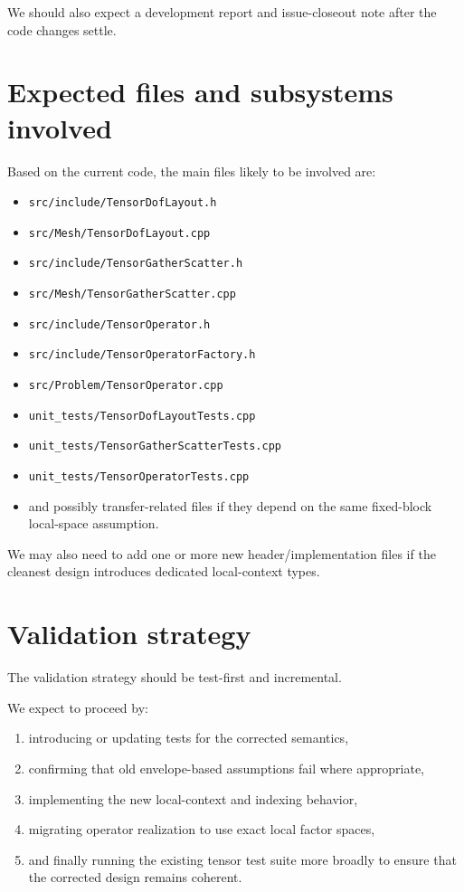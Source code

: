 \documentclass[11pt]{article}
\begin{document}
We should also expect a development report and issue-closeout note after the code changes settle.

\section{Expected files and subsystems involved}

Based on the current code, the main files likely to be involved are:

\begin{itemize}[leftmargin=2em]
\item \texttt{src/include/TensorDofLayout.h}
\item \texttt{src/Mesh/TensorDofLayout.cpp}
\item \texttt{src/include/TensorGatherScatter.h}
\item \texttt{src/Mesh/TensorGatherScatter.cpp}
\item \texttt{src/include/TensorOperator.h}
\item \texttt{src/include/TensorOperatorFactory.h}
\item \texttt{src/Problem/TensorOperator.cpp}
\item \texttt{unit\_tests/TensorDofLayoutTests.cpp}
\item \texttt{unit\_tests/TensorGatherScatterTests.cpp}
\item \texttt{unit\_tests/TensorOperatorTests.cpp}
\item and possibly transfer-related files if they depend on the same fixed-block local-space assumption.
\end{itemize}

We may also need to add one or more new header/implementation files if the cleanest design introduces dedicated local-context types.

\section{Validation strategy}

The validation strategy should be test-first and incremental.

We expect to proceed by:

\begin{enumerate}[leftmargin=2em]
\item introducing or updating tests for the corrected semantics,
\item confirming that old envelope-based assumptions fail where appropriate,
\item implementing the new local-context and indexing behavior,
\item migrating operator realization to use exact local factor spaces,
\item and finally running the existing tensor test suite more broadly to ensure that the corrected design remains coherent.
\end{enumerate}
\end{document}
